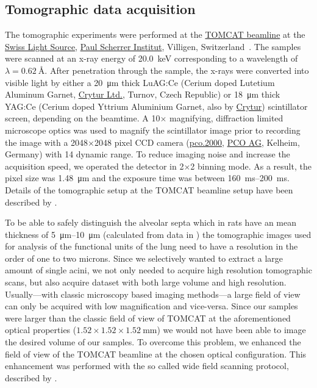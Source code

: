\documentclass[%
	paper=a4,%
	abstract=true,%
	]{scrartcl}
\begin{document}
\subsection{Tomographic data acquisition}
The tomographic experiments were performed at the \href{http://www.psi.ch/sls/tomcat/}{TOMCAT beamline} at the \href{http://www.psi.ch/sls/}{Swiss Light Source}, \href{http://www.psi.ch/}{Paul Scherrer Institut}, Villigen, Switzerland~\cite{Stampanoni2006a}. The samples were scanned at an x-ray energy of \SI{20.0}{\kilo\electronvolt} corresponding to a wavelength of \(\lambda=\SI{0.62}{\angstrom}\). %
After penetration through the sample, the x-rays were converted into visible light by either a \SI{20}{\micro\meter} thick LuAG:Ce (Cerium doped Lutetium Aluminum Garnet, \href{http://www.crytur.cz/}{Crytur Ltd.}, Turnov, Czech Republic) or \SI{18}{\micro\meter} thick YAG:Ce (Cerium doped Yttrium Aluminium Garnet, also by \href{http://www.crytur.cz/}{Crytur}) scintillator screen, depending on the beamtime. A 10\(\times\) magnifying, diffraction limited microscope optics was used to magnify the scintillator image prior to recording the image with a 2048\(\times\)2048 pixel CCD camera (\href{http://www.pco.de/sensitive-cameras/pco2000/}{pco.2000}, \href{http://www.pco.de/}{PCO AG}, Kelheim, Germany) with \SI{14}{\bit} dynamic range. To reduce imaging noise and increase the acquisition speed, we operated the detector in 2\(\times\)2 binning mode. As a result, the pixel size was \SI{1.48}{\micro\meter} and the exposure time was between \SIrange{160}{200}{\milli\second}. Details of the tomographic setup at the TOMCAT beamline setup have been described by \citet{Stampanoni2006a}.

To be able to safely distinguish the alveolar septa which in rats have an mean thickness of \SIrange{5}{10}{\micro\meter} (calculated from data in \citet{Burri1974}) the tomographic images used for analysis of the functional units of the lung need to have a resolution in the order of one to two microns. Since we selectively wanted to extract a large amount of single acini, we not only needed to acquire high resolution tomographic scans, but also acquire dataset with both large volume and high resolution. Usually---with classic microscopy based imaging methods---a large field of view can only be acquired with low magnification and vice-versa. Since our samples were larger than the classic field of view of TOMCAT at the aforementioned optical properties (\(1.52\times1.52\times\SI{1.52}{\milli\meter}\)) we would not have been able to image the desired volume of our samples. To overcome this problem, we enhanced the field of view of the TOMCAT beamline at the chosen optical configuration. This enhancement was performed with the so called wide field scanning protocol, described by \citet{Haberthuer2010a}.
\end{document}
